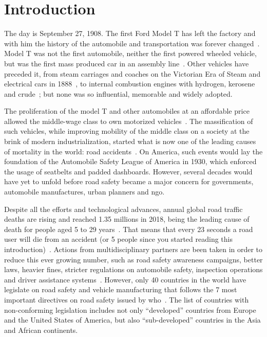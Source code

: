 \chapter{Introduction}
\label{chapter:introduction}

The day is September 27, 1908. The first Ford Model T has left the factory and with him the history of the automobile and transportation was forever changed~\cite{Ford, JohnSteeleGordon2007}. Model T was not the first automobile, neither the first powered wheeled vehicle, but was the first mass produced car in an assembly line~\cite{JohnSteeleGordon2007, DailyNews2013}. Other vehicles have preceded it, from steam carriages and coaches on the Victorian Era of Steam and  electrical cars in 1888~\cite{PaulA.Hughes}, to internal combustion engines with hydrogen, kerosene and crude~\cite{Setright2003}; but none was so influential, memorable and widely adopted. 

The proliferation of the model T and other automobiles at an affordable price allowed the middle-wage class to own motorized vehicles~\cite{JohnSteeleGordon2007, DailyNews2013}. The massification of such vehicles, while improving mobility of the middle class on a society at the brink of modern industrialization, started what is now one of the leading causes of mortality in the world: road accidents~\cite{WHO2018}. On America, such events would lay the foundation of the Automobile Safety League of America in 1930, which enforced the usage of seatbelts and padded dashboards. However, several decades would have yet to unfold before road safety became a major concern for governments, automobile manufactures, urban planners and \ac{ngo}. 

Despite all the efforts and technological advances, annual global road traffic deaths are rising and reached 1.35 millions in 2018, being the leading cause of death for people aged 5 to 29 years~\cite{WHO2018}. That means that every 23 seconds a road user will die from an accident (or 5 people since you started reading this introduction)~\cite{WHOvisualizer}. Actions from multidisciplinary partners are been taken in order to reduce this ever growing number, such as road safety awareness campaigns, better laws, heavier fines, stricter regulations on automobile safety, inspection operations and driver assistance systems~\cite{WHO2018, EUroads}. However, only 40 countries in the world have legislate on road safety and vehicle manufacturing that follows the 7 most important directives on road safety issued by \acf{who}~\cite{WHOvisualizer}. The list of countries with non-conforming legislation includes not only ``developed'' countries from Europe and the United States of America, but also ``sub-developed'' countries in the Asia and African continents.

